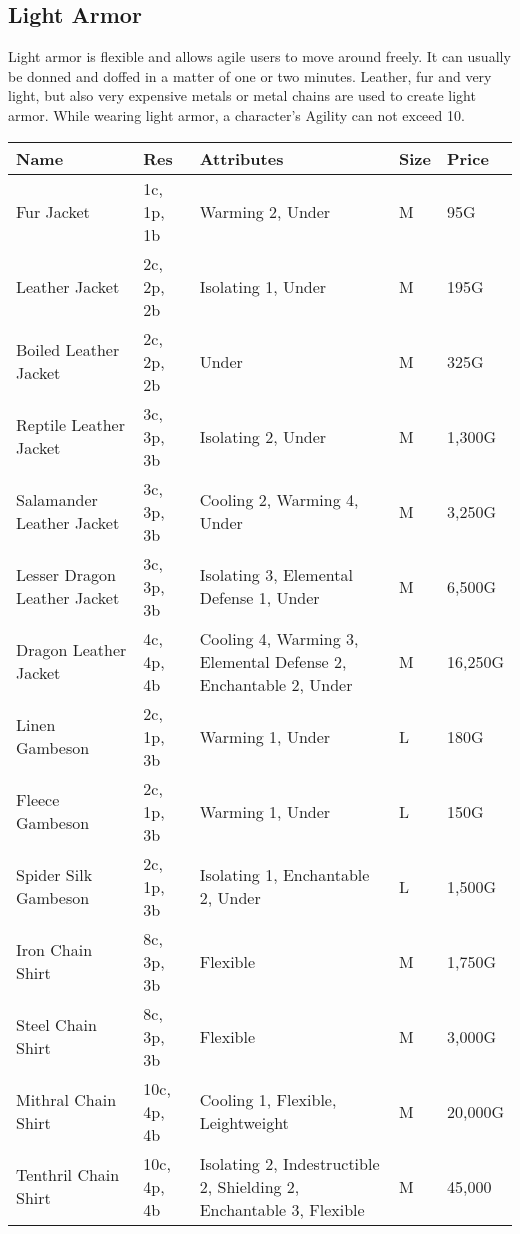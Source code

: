 \subsection{Light Armor}\label{subsec:lightArmor}

Light armor is flexible and allows agile users to move around freely.
It can usually be donned and doffed in a matter of one or two minutes.
Leather, fur and very light, but also very expensive metals or metal chains are used to create light armor.
While wearing light armor, a character's Agility can not exceed 10.

\begin{longtable}{p{3.5cm} | p{1.5cm} | p{5cm} | p{1cm} | p{1.25cm}}
	Name & Res &  Attributes & Size & Price\\ \hline
	Fur Jacket & 1c, 1p, 1b & Warming 2, Under & M & 95G\\
	
	Leather Jacket & 2c, 2p, 2b & Isolating 1, Under & M & 195G\\
	
	Boiled Leather Jacket & 2c, 2p, 2b & Under & M & 325G\\
	
	Reptile Leather Jacket & 3c, 3p, 3b & Isolating 2, Under & M & 1,300G\\
	
	Salamander Leather Jacket & 3c, 3p, 3b & Cooling 2, Warming 4, Under & M & 3,250G\\
	
	Lesser Dragon Leather Jacket & 3c, 3p, 3b & Isolating 3, Elemental Defense 1, Under & M & 6,500G\\
	
	Dragon Leather Jacket & 4c, 4p, 4b & Cooling 4, Warming 3, Elemental Defense 2, Enchantable 2, Under & M & 16,250G\\
	
	Linen Gambeson & 2c, 1p, 3b & Warming 1, Under & L & 180G\\
	
	Fleece Gambeson & 2c, 1p, 3b & Warming 1, Under & L & 150G\\
	
	Spider Silk Gambeson & 2c, 1p, 3b & Isolating 1, Enchantable 2, Under & L & 1,500G\\
	
	Iron Chain Shirt & 8c, 3p, 3b & Flexible & M & 1,750G\\
	
	Steel Chain Shirt & 8c, 3p, 3b & Flexible & M & 3,000G\\
	
	Mithral Chain Shirt & 10c, 4p, 4b & Cooling 1, Flexible, Leightweight & M & 20,000G\\
	
	Tenthril Chain Shirt & 10c, 4p, 4b & Isolating 2, Indestructible 2, Shielding 2, Enchantable 3, Flexible & M & 45,000\\
\end{longtable}